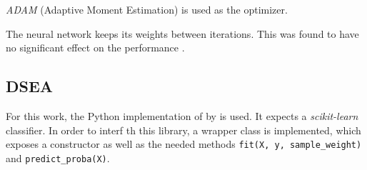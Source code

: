 
\emph{ADAM} (Adaptive Moment Estimation) \cite{adam} is used as the optimizer.

The neural network keeps its weights between \dsea{} iterations.
This was found to have no significant effect on the performance \cite{dsea_samuel}. %


\subsection{DSEA}
For this work, the Python implementation of \dsea{} \cite{dsea_code} by \citeauthor{dsea_mirko} is used.
It expects a \emph{scikit-learn} classifier.
In order to interf\corn{} th this library,
a wrapper class is implemented,
  which exposes a constructor as well as the needed methods
  \texttt{fit(X, y, sample_weight)} and
  \texttt{predict_proba(X)}.
